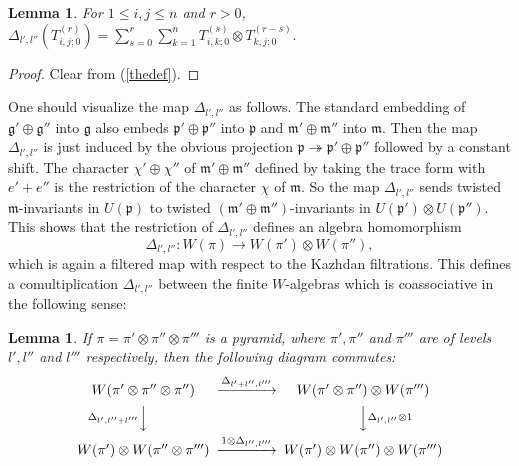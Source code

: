 \documentclass[twoside,12pt,reqno]{amsart}
\newtheorem{Lemma}[Proposition]{Lemma}
\begin{document}
\begin{Lemma}\label{howithappens}
For $1 \leq i,j \leq n$ and $r > 0$,
$\displaystyle \Delta_{l',l''}(T_{i,j;0}^{(r)})
=
\sum_{s=0}^r \sum_{k=1}^n T_{i,k;0}^{(s)} \otimes T_{k,j;0}^{(r-s)}.$
\end{Lemma}
\begin{proof}
Clear from (\ref{thedef}).
\end{proof}

One should visualize the map $\Delta_{l',l''}$ as follows.
The standard embedding of
$\mathfrak{g}' \oplus \mathfrak{g}''$
into $\mathfrak{g}$ also embeds
$\mathfrak{p}' \oplus \mathfrak{p}''$ into 
$\mathfrak{p}$ and $\mathfrak{m}' \oplus \mathfrak{m}''$
into $\mathfrak{m}$. Then the map $\Delta_{l',l''}$
is just induced by the obvious projection
$\mathfrak{p} \twoheadrightarrow \mathfrak{p}' \oplus \mathfrak{p}''$
followed by a constant shift.
The character $\chi' \oplus \chi''$ of $\mathfrak{m}' \oplus \mathfrak{m}''$
defined by taking the trace form with $e'+e''$
is the restriction of the character $\chi$ of $\mathfrak{m}$.
So the map $\Delta_{l',l''}$ sends
twisted $\mathfrak{m}$-invariants in $U(\mathfrak{p})$
to twisted $(\mathfrak{m}' \oplus \mathfrak{m}'')$-invariants
in $U(\mathfrak{p}') \otimes U(\mathfrak{p}'')$.
This shows that the restriction of $\Delta_{l',l''}$ defines an
algebra homomorphism
\begin{equation}\label{comulty}
\Delta_{l',l''}:W(\pi) \rightarrow W(\pi') \otimes W(\pi''),
\end{equation}
which is again a filtered map with respect to the
Kazhdan filtrations.
This defines a comultiplication $\Delta_{l',l''}$ 
between the finite $W$-algebras
which is 
coassociative in the following sense:

\begin{Lemma}\label{coass}
If $\pi = \pi' \otimes \pi'' \otimes \pi'''$ is a pyramid,
where $\pi', \pi''$ and $\pi'''$ are of levels
$l',l''$ and $l'''$ respectively, then the
following diagram commutes:
\begin{equation*}
\begin{CD}
W(\pi' \otimes \pi'' \otimes \pi'') & @>\Delta_{l'+l'',l'''}>> & W(\pi' \otimes \pi'') \otimes W(\pi''')\\
@V\Delta_{l',l''+l'''} VV&&@VV\Delta_{l',l''} \otimes 1V\\
W(\pi') \otimes W(\pi'' \otimes \pi''') &@>1 \otimes \Delta_{l'',l'''}>> &W(\pi') \otimes W(\pi'')
\otimes W(\pi''')
\end{CD}
\end{equation*}
\end{Lemma}
\end{document}
